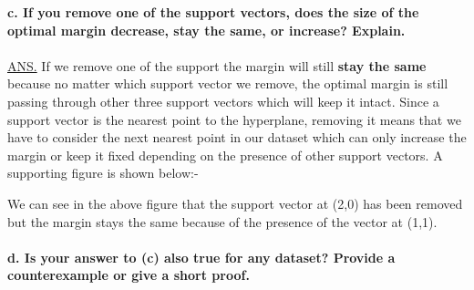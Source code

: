 \documentclass{article}
\begin{document}
\textbf {c. If you remove one of the support vectors, does the size of the optimal margin decrease, stay the same, or increase? Explain.}
\\~\\
\underline{ANS.} If we remove one of the support the margin will still \textbf{stay the same} because no matter which support vector we remove, the optimal margin is still passing through other three support vectors which will keep it intact. Since a support vector is the nearest point to the hyperplane, removing it means that we have to consider the next nearest point in our dataset which can only increase the margin or keep it fixed depending on the presence of other support vectors. A supporting figure is shown below:-
\begin{center}
\end{center}
We can see in the above figure that the support vector at (2,0) has been removed but the margin stays the same because of the presence of the vector at (1,1).
\\~\\
\textbf{d. Is your answer to (c) also true for any dataset? Provide a counterexample or give a short proof.}
\\~\\
\end{document}

